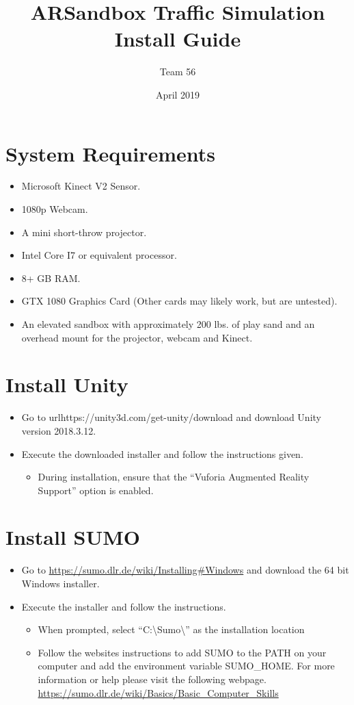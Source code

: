 \documentclass{article}
\title{ARSandbox Traffic Simulation Install Guide}
\author{Team 56}
\date{April 2019}
\begin{document}
\maketitle

\section{System Requirements}
    \begin{itemize}
        \item Microsoft Kinect V2 Sensor.
        \item 1080p Webcam.
        \item A mini short-throw projector.
        \item Intel Core I7 or equivalent processor.
        \item 8+ GB RAM.
        \item GTX 1080 Graphics Card (Other cards may likely work, but are untested).
        \item An elevated sandbox with approximately 200 lbs. of play sand and an overhead mount for the projector, webcam and Kinect. 
    \end{itemize}
    
\section{Install Unity}
\begin{itemize}
    \item Go to url{https://unity3d.com/get-unity/download} and download Unity version 2018.3.12.
    \item Execute the downloaded installer and follow the instructions given.
    \begin{itemize}
        \item During installation, ensure that the “Vuforia Augmented Reality Support” option is enabled.
    \end{itemize}
\end{itemize}

\section{Install SUMO}
\begin{itemize}
    \item Go to \url{https://sumo.dlr.de/wiki/Installing#Windows} and download the 64 bit Windows installer.
    \item Execute the installer and follow the instructions.
    \begin{itemize}
        \item When prompted, select “C:\textbackslash Sumo\textbackslash” as the installation location
        \item Follow the websites instructions to add SUMO to the PATH on your computer and add the environment variable SUMO\_HOME. For more information or help please visit the following webpage. \url{https://sumo.dlr.de/wiki/Basics/Basic_Computer_Skills}
    \end{itemize}
    
\end{itemize}
\end{document}

